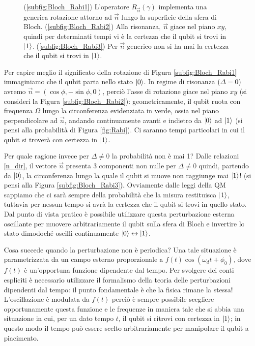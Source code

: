 \begin{figure}[!ht]
	\caption{(\ref{subfig:Bloch_Rabi1}) L'operatore $R_{\vec n}(\gamma)$ implementa una generica rotazione attorno ad $\vec n$ lungo la superficie della sfera di Bloch. (\ref{subfig:Bloch_Rabi2}) Alla risonanza, $\vec n$ giace nel piano $xy$, quindi per determinati tempi vi è la certezza che il qubit si trovi in $\ket{1}$. (\ref{subfig:Bloch_Rabi3}) Per $\vec n$ generico non si ha mai la certezza che il qubit si trovi in $\ket{1}$.}
    \label{fig:Bloch_Rabi}
\end{figure}

\noindent Per capire meglio il significato della rotazione di Figura \ref{subfig:Bloch_Rabi1} immaginiamo che il qubit parta nello stato $\ket{0}$. In regime di risonanza ($\Delta = 0$) avremo $\vec n = (\cos \phi, - \sin \phi, 0)$, perciò l'asse di rotazione giace nel piano $xy$ (si consideri la Figura \ref{subfig:Bloch_Rabi2}): geometricamente, il qubit ruota con frequenza $\Omega$ lungo la circonferenza evidenziata in verde, ossia nel piano perpendicolare ad $\vec n$, andando continuamente avanti e indietro da $\ket{0}$ ad $\ket{1}$ (si pensi alla probabilità di Figura \ref{fig:Rabi}). Ci saranno tempi particolari in cui il qubit si trover\`a con certezza in $\ket{1}$.

\noindent Per quale ragione invece per $\Delta \neq 0$ la probabilità non è mai 1? Dalle relazioni \eqref{n_dir}, il vettore $\vec n$ presenta 3 componenti non nulle per $\Delta \neq 0$ quindi, partendo da $\ket{0}$, la circonferenza lungo la quale il qubit si muove non raggiunge mai $\ket{1}$! (si pensi alla Figura \ref{subfig:Bloch_Rabi3}). Ovviamente dalle leggi della QM sappiamo che ci sarà sempre della probabilità che la misura restituisca $\ket{1}$, tuttavia per nessun tempo si avrà la certezza che il qubit si trovi in quello stato. Dal punto di vista pratico è possibile utilizzare questa perturbazione esterna oscillante per muovere arbitrariamente il qubit sulla sfera di Bloch e invertire lo stato dimodoché oscilli continuamente $\ket{0} \leftrightarrow \ket{1}$. 

\noindent Cosa succede quando la perturbazione non è periodica? Una tale situazione è parametrizzata da un campo esterno proporzionale a $f(t) \cos (\omega_d t + \phi_0)$, dove $f(t)$ è un'opportuna funzione dipendente dal tempo. Per svolgere dei conti espliciti è necessario utilizzare il formalismo della teoria delle perturbazioni dipendenti dal tempo: il punto fondamentale è che la fisica rimane la stessa! L'oscillazione è modulata da $f(t)$ perciò è sempre possibile scegliere opportunamente questa funzione e le frequenze in maniera tale che si abbia una situazione in cui, per un dato tempo $t$, il qubit si ritrovi con certezza in $\ket{1}$; in questo modo il tempo può essere scelto arbitrariamente per manipolare il qubit a piacimento. 










